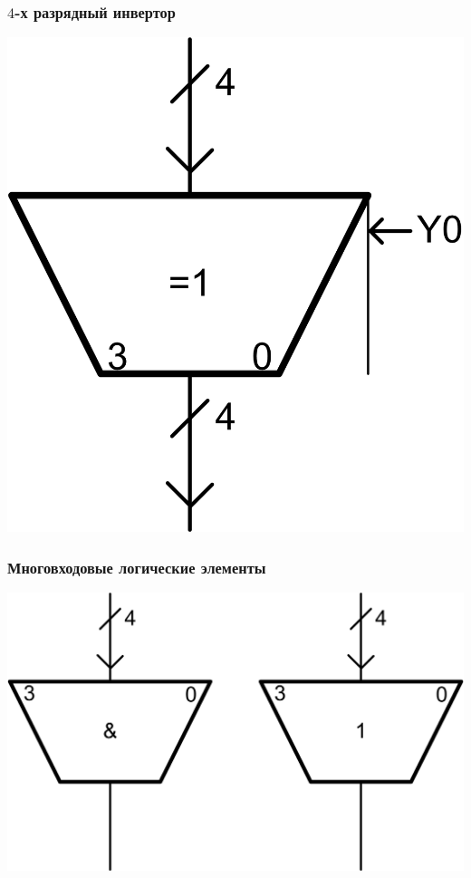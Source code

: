 \begin{frame}
    \frametitle{$4$-х разрядный инвертор}
    \begin{center}
        \includegraphics{fig/invertor}
    \end{center}
\end{frame}

\begin{frame}
    \frametitle{Многовходовые логические элементы}
    \begin{center}
        \includegraphics{fig/bigAnd}
    \end{center}
\end{frame}
    
